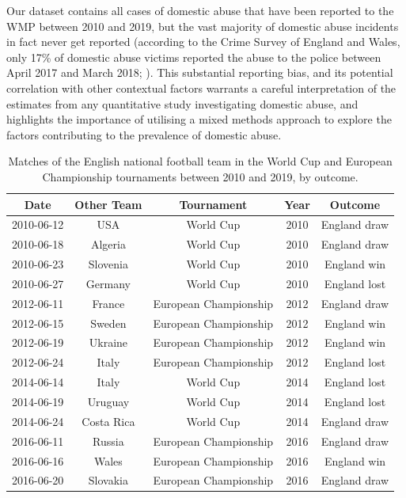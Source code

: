 \documentclass[12pt, a4paper]{article}
\begin{document}
Our dataset contains all cases of domestic abuse that have been reported to the WMP between 2010 and 2019, but the vast majority of domestic abuse incidents in fact never get reported (according to the Crime Survey of England and Wales, only 17\% of domestic abuse victims reported the abuse to the police between April 2017 and March 2018; ). This substantial reporting bias, and its potential correlation with other contextual factors warrants a careful interpretation of the estimates from any quantitative study investigating domestic abuse, and highlights the importance of utilising a mixed methods approach to explore the factors contributing to the prevalence of domestic abuse. 
  
 
 
\begin{table}[!htbp]
\centering
    \caption{Matches of the English national football team in the World Cup and European Championship tournaments between 2010 and 2019, by outcome.}
\begin{tabular}{ccccc}
  \hline
\textbf{Date} & \textbf{Other Team} & \textbf{Tournament} & \textbf{Year} & \textbf{Outcome} \\ 
  \hline
2010-06-12 & USA & World Cup & 2010 & England draw \\ 
  2010-06-18 & Algeria & World Cup & 2010 & England draw \\ 
  2010-06-23 & Slovenia & World Cup & 2010 & England win \\ 
  2010-06-27 & Germany & World Cup & 2010 & England lost \\ 
  2012-06-11 & France & European Championship & 2012 & England draw \\ 
  2012-06-15 & Sweden & European Championship & 2012 & England win \\ 
  2012-06-19 & Ukraine & European Championship & 2012 & England win \\ 
  2012-06-24 & Italy & European Championship & 2012 & England lost \\ 
  2014-06-14 & Italy & World Cup & 2014 & England lost \\ 
  2014-06-19 & Uruguay & World Cup & 2014 & England lost \\ 
  2014-06-24 & Costa Rica & World Cup & 2014 & England draw \\ 
  2016-06-11 & Russia & European Championship & 2016 & England draw \\ 
  2016-06-16 & Wales & European Championship & 2016 & England win \\ 
  2016-06-20 & Slovakia & European Championship & 2016 & England draw \\ 

\end{tabular}
\end{table}
\end{document}
